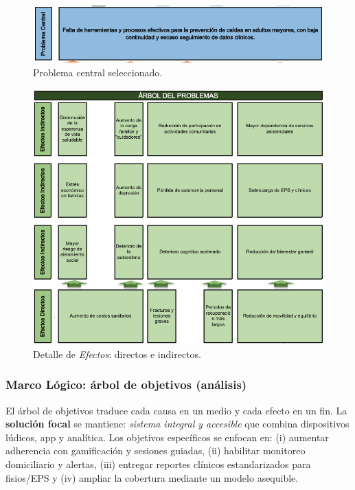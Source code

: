 \begin{figure}[H]\centering
\includegraphics[width=.95\linewidth]{Figures/Arbol_Problemas/02_problema_central.png}
\caption{Problema central seleccionado.}
\end{figure}

\begin{figure}[H]\centering
\includegraphics[width=.95\linewidth]{Figures/Arbol_Problemas/03_efectos_directos_indirectos.png}
\caption{Detalle de \emph{Efectos}: directos e indirectos.}
\end{figure}

\subsubsection{Marco Lógico: árbol de objetivos (análisis)}
El árbol de objetivos traduce cada causa en un medio y cada efecto en un fin. La \textbf{solución focal} se mantiene: \emph{sistema integral y accesible} que combina dispositivos lúdicos, app y analítica. Los objetivos específicos se enfocan en: (i) aumentar adherencia con gamificación y sesiones guiadas, (ii) habilitar monitoreo domiciliario y alertas, (iii) entregar reportes clínicos estandarizados para fisios/EPS y (iv) ampliar la cobertura mediante un modelo asequible.

